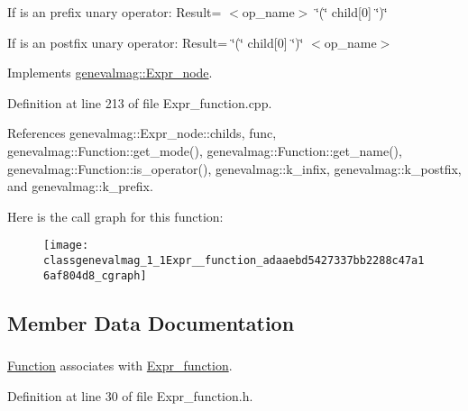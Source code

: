 If is an prefix unary operator: Result= $<$op\_\-name$>$ \char`\"{}(\char`\"{} child\mbox{[}0\mbox{]} \char`\"{})\char`\"{}

If is an postfix unary operator: Result= \char`\"{}(\char`\"{} child\mbox{[}0\mbox{]} \char`\"{})\char`\"{} $<$op\_\-name$>$ 

Implements \hyperlink{classgenevalmag_1_1Expr__node_adea1d8fbc1b01f018e18cedad871f6a7}{genevalmag::Expr\_\-node}.



Definition at line 213 of file Expr\_\-function.cpp.



References genevalmag::Expr\_\-node::childs, func, genevalmag::Function::get\_\-mode(), genevalmag::Function::get\_\-name(), genevalmag::Function::is\_\-operator(), genevalmag::k\_\-infix, genevalmag::k\_\-postfix, and genevalmag::k\_\-prefix.



Here is the call graph for this function:\nopagebreak
\begin{figure}[H]
\begin{center}
\leavevmode
\texttt{[image: classgenevalmag\_1\_1Expr\_\_function\_adaaebd5427337bb2288c47a16af804d8\_cgraph]}
\end{center}
\end{figure}




\subsection{Member Data Documentation}
\hypertarget{classgenevalmag_1_1Expr__function_a8248bebb1840bf2d2fcb2e818ba5a3eb}{
\subsubsection[{func}]{}}
\label{classgenevalmag_1_1Expr__function_a8248bebb1840bf2d2fcb2e818ba5a3eb}


\hyperlink{classgenevalmag_1_1Function}{Function} associates with \hyperlink{classgenevalmag_1_1Expr__function}{Expr\_\-function}. 



Definition at line 30 of file Expr\_\-function.h.




